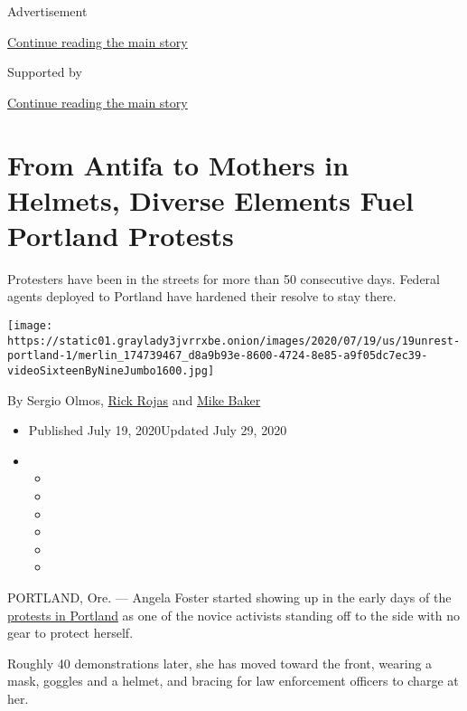 Advertisement

\protect\hyperlink{after-top}{Continue reading the main story}

Supported by

\protect\hyperlink{after-sponsor}{Continue reading the main story}

\hypertarget{from-antifa-to-mothers-in-helmets-diverse-elements-fuel-portland-protests}{%
\section{From Antifa to Mothers in Helmets, Diverse Elements Fuel
Portland
Protests}\label{from-antifa-to-mothers-in-helmets-diverse-elements-fuel-portland-protests}}

Protesters have been in the streets for more than 50 consecutive days.
Federal agents deployed to Portland have hardened their resolve to stay
there.

\texttt{[image: https://static01.graylady3jvrrxbe.onion/images/2020/07/19/us/19unrest-portland-1/merlin\_174739467\_d8a9b93e-8600-4724-8e85-a9f05dc7ec39-videoSixteenByNineJumbo1600.jpg]}

By Sergio Olmos,
\href{https://www.nytimes3xbfgragh.onion/by/rick-rojas}{Rick Rojas} and
\href{https://www.nytimes3xbfgragh.onion/by/mike-baker}{Mike Baker}

\begin{itemize}
\item
  Published July 19, 2020Updated July 29, 2020
\item
  \begin{itemize}
  \item
  \item
  \item
  \item
  \item
  \item
  \end{itemize}
\end{itemize}

PORTLAND, Ore. --- Angela Foster started showing up in the early days of
the
\href{https://www.nytimes3xbfgragh.onion/2020/07/29/us/protests-portland-federal-withdrawal.html}{protests
in Portland} as one of the novice activists standing off to the side
with no gear to protect herself.

Roughly 40 demonstrations later, she has moved toward the front, wearing
a mask, goggles and a helmet, and bracing for law enforcement officers
to charge at her.

